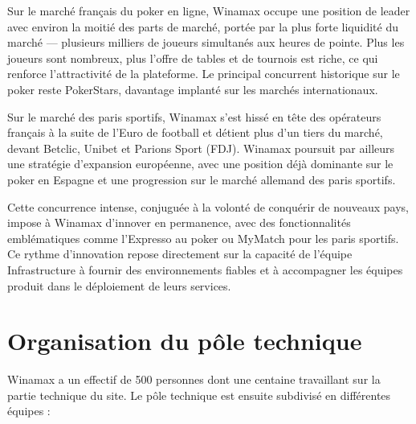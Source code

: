 Sur le marché français du poker en ligne, Winamax occupe une position de leader avec environ la
moitié des parts de marché, portée par la plus forte liquidité du marché — plusieurs milliers de joueurs
simultanés aux heures de pointe. Plus les joueurs sont nombreux, plus l'offre de tables et de tournois
est riche, ce qui renforce l'attractivité de la plateforme. Le principal concurrent historique sur le
poker reste PokerStars, davantage implanté sur les marchés internationaux.

Sur le marché des paris sportifs, Winamax s'est hissé en tête des opérateurs français à la suite de l'Euro
de football et détient plus d'un tiers du marché, devant Betclic, Unibet et Parions Sport (FDJ). Winamax
poursuit par ailleurs une stratégie d'expansion européenne, avec une position déjà dominante sur le
poker en Espagne et une progression sur le marché allemand des paris sportifs.

Cette concurrence intense, conjuguée à la volonté de conquérir de nouveaux pays, impose à Winamax
d'innover en permanence, avec des fonctionnalités emblématiques comme l'Expresso au poker ou
MyMatch pour les paris sportifs. Ce rythme d'innovation repose directement sur la capacité de
l'équipe Infrastructure à fournir des environnements fiables et à accompagner les équipes produit
dans le déploiement de leurs services.

\section{Organisation du pôle technique}

Winamax a un effectif de 500 personnes dont une centaine travaillant sur la partie 
technique du site. Le pôle technique est ensuite subdivisé en différentes équipes :

